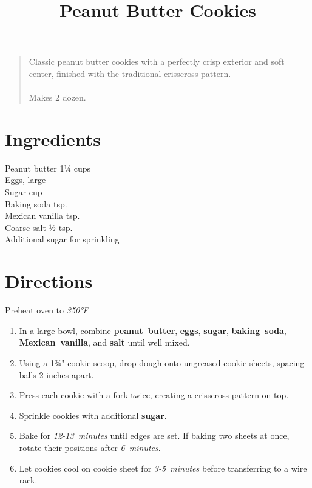 \documentclass[11pt,letterpaper]{article}
\title{Peanut Butter Cookies}
\author{}
\date{}
\begin{document}
\maketitle
\thispagestyle{empty}

\begin{quote}
\small
\begin{em}
Classic peanut butter cookies with a perfectly crisp exterior and soft center, finished with the traditional crisscross pattern. \\
\\
Makes 2 dozen.
\end{em}
\end{quote}

\section*{Ingredients}
\begin{multicols}{2}
\noindent
    Peanut butter \dotfill 1¼ cups \\
    Eggs, large  \\
    Sugar  cup \\
    Baking soda  tsp. \\
    Mexican vanilla  tsp. \\
    Coarse salt \dotfill ½ tsp. \\
    Additional sugar for sprinkling
\end{multicols}

\section*{Directions}

\noindent
Preheat oven to \textit{350°F}

\begin{enumerate}
    \item In a large bowl, combine \textbf{peanut~butter}, \textbf{eggs}, \textbf{sugar}, \textbf{baking~soda}, \\\textbf{Mexican~vanilla}, and \textbf{salt} until well mixed.
    \item Using a 1¾" cookie scoop, drop dough onto ungreased cookie sheets, spacing balls 2 inches apart.
    \item Press each cookie with a fork twice, creating a crisscross pattern on top.
    \item Sprinkle cookies with additional \textbf{sugar}.
    \item Bake for \textit{12-13~minutes} until edges are set. If baking two sheets at once, rotate their positions after \textit{6~minutes}.
    \item Let cookies cool on cookie sheet for \textit{3-5~minutes} before transferring to a wire rack.
\end{enumerate}
\end{document}

